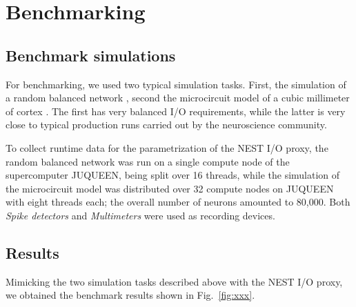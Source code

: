 \documentclass[]{YIC2015}
\begin{document}
\section{Benchmarking}

\subsection{Benchmark simulations}\label{sect:use_cases}

For benchmarking,
we used two typical simulation tasks. First, the
simulation of a random balanced network \cite{morrison07}, second the
microcircuit model of a cubic millimeter of cortex \cite{potjans14}.
The first has very balanced I/O requirements, while the latter is very
close to typical production runs carried out by the neuroscience
community.

To collect runtime data for the parametrization of the NEST I/O proxy,
the random balanced network was run on a single compute
node of the supercomputer JUQUEEN, being split over 16 threads, while
the simulation of the microcircuit model was distributed over 32
compute nodes on JUQUEEN with eight threads each; the overall number
of neurons amounted to 80,000. Both \emph{Spike detectors} and \emph{Multimeters}
were used as recording devices.

\subsection{Results}


Mimicking the two simulation tasks described above with the NEST I/O proxy, we obtained
the benchmark results shown in Fig.~\ref{fig:xxx}.
\end{document}
